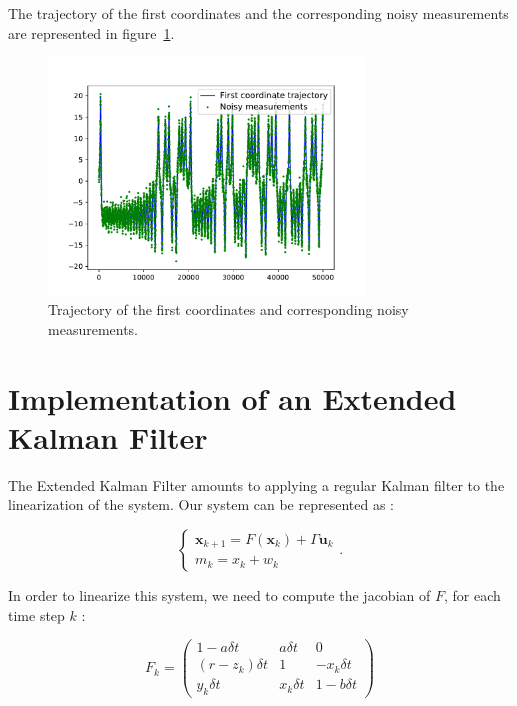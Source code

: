 \documentclass[english, DIV=13]{scrartcl}
\renewcommand{\vec}[1]{\mathbf{#1}}
\begin{document}
The trajectory of the first coordinates and the corresponding noisy measurements
are represented in figure~\ref{fig:q2-mes-vs-real}.

\begin{figure}[ht!]
    \centering
    \includegraphics[width=0.75\textwidth]{figures/q2-mes-vs-real}
    \caption{Trajectory of the first coordinates and corresponding noisy measurements.}
    \label{fig:q2-mes-vs-real}
\end{figure}


\section{Implementation of an Extended Kalman Filter}

The Extended Kalman Filter amounts to applying a regular Kalman filter to the linearization of the system. Our system can be represented as :


\begin{equation*}
    \begin{cases}
        \vec{x}_{k+1} = F(\vec{x}_k) + \Gamma\vec{u}_k \\
        m_k = x_k + w_k
    \end{cases}.
\end{equation*}

In order to linearize this system, we need to compute the jacobian of $F$, for each time step $k$ :

\begin{equation*}
F_k = 
    \begin{pmatrix}
        1 - a \delta t & a \delta t & 0 \\
        (r - z_k) \delta t & 1 & - x_k \delta t \\
        y_k \delta t & x_k \delta t & 1 - b \delta t
    \end{pmatrix}
\end{equation*}
\end{document}
